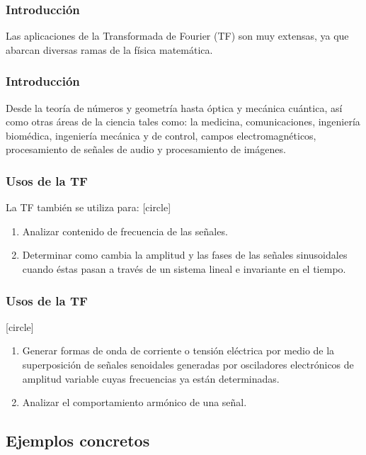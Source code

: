 \begin{frame}
\frametitle{Introducción}
Las aplicaciones de la Transformada de Fourier (TF) son muy extensas, ya que abarcan diversas ramas de la física matemática.
\end{frame}
\begin{frame}
\frametitle{Introducción}
Desde la teoría de números y geometría hasta óptica y mecánica cuántica, así como otras áreas de la ciencia tales como: la medicina, comunicaciones, ingeniería biomédica, ingeniería mecánica y de control, campos electromagnéticos, procesamiento de señales de audio y procesamiento de imágenes.
\end{frame}
\begin{frame}
\frametitle{Usos de la TF}
La TF también se utiliza para:
[circle]
\begin{enumerate}[<+->]
\item Analizar contenido de frecuencia de las señales.
\item Determinar como cambia la amplitud y las fases de las señales sinusoidales cuando éstas pasan a través de un sistema lineal e invariante en el tiempo.
\seti
\end{enumerate}
\end{frame}
\begin{frame}
\frametitle{Usos de la TF}
[circle]
\begin{enumerate}[<+->]
\conti
\item Generar formas de onda de corriente o tensión eléctrica por medio de la superposición de señales senoidales generadas por osciladores electrónicos de amplitud variable cuyas frecuencias ya están determinadas.
\item Analizar el comportamiento armónico de una señal.
\end{enumerate}
\end{frame}

\subsection{Ejemplos concretos}


